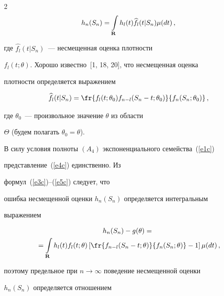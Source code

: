 \begin{multicols}{2}
\begin{equation} 


h_n(S_n)=\intp h_l(t) \widehat{f_l}(t|S_n) \mu(dt)\,,


\label{e4c}


\end{equation}


  где $\widehat{f_l}(t|S_n)$~--- несмещенная оценка плотности


  $f_l(t;\theta)$. Хорошо известно~[1, 18, 20], что несмещенная оценка


  плотности определяется выраже\-нием


\begin{equation} 


\widehat{f_l}(t|S_n)=\fr{f_l(t;\theta_0)


    f_{n-l}(S_n-t;\theta_0)} {f_n(S_n;\theta_0)}\,,


\label{e5c}


\end{equation}


 где $\theta_0$~--- произвольное значение $\theta$ из области


  $\Theta$ (будем полагать $\theta_0=\theta$).


  В силу условия полноты  $(A_4)$ экспоненциального семейства~(\ref{e1c})


  представление~(\ref{e4c}) единственно. Из 


формул~(\ref{e3c})--(\ref{e5c}) следует, что


  ошибка несмещенной оценки $h_n(S_n)$ определяется интегральным


  выражением


\begin{multline}  


h_n(S_n)-g(\theta)={}\\


{}=\intp h_l(t) f_l(t;\theta)


      \left[ \fr{f_{n-l}(S_n-t;\theta)} {f_n(S_n;\theta)}-


      1\right] \mu(dt)\,,


\label{e6c}


\end{multline}


 поэтому предельное при $n\rightarrow\infty$ поведение несмещенной оценки


  $h_n(S_n)$ определяется отношением


\begin{equation}  



\end{equation}
\end{multicols}
